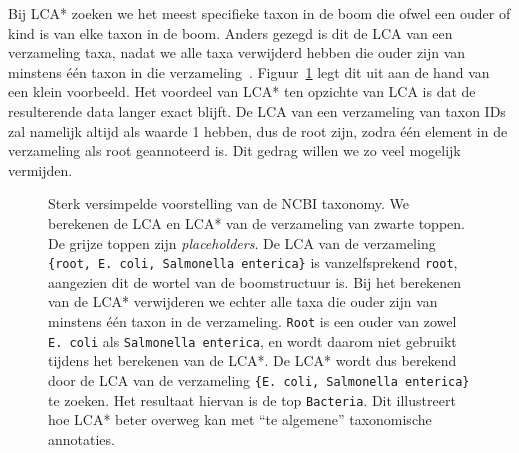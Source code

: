 Bij LCA* zoeken we het meest specifieke taxon in de boom die ofwel een ouder of kind is van elke taxon in de boom.
Anders gezegd is dit de LCA van een verzameling taxa, nadat we alle taxa verwijderd hebben die ouder zijn van minstens één taxon in die verzameling~\cite{UMGAP_paper}.
Figuur~\ref{fig:lca*_example} legt dit uit aan de hand van een klein voorbeeld.
Het voordeel van LCA* ten opzichte van LCA is dat de resulterende data langer exact blijft.
De LCA van een verzameling van taxon IDs zal namelijk altijd als waarde 1 hebben, dus de root zijn, zodra één element in de verzameling als root geannoteerd is.
Dit gedrag willen we zo veel mogelijk vermijden.
\\
\begin{figure}[ht]
    \centering

    \caption{Sterk versimpelde voorstelling van de NCBI taxonomy. We berekenen de LCA en LCA* van de verzameling van zwarte toppen. De grijze toppen zijn \textit{placeholders}. De LCA van de verzameling \texttt{\{root, E. coli, Salmonella enterica\}} is vanzelfsprekend \texttt{root}, aangezien dit de wortel van de boomstructuur is. Bij het berekenen van de LCA* verwijderen we echter alle taxa die ouder zijn van minstens één taxon in de verzameling. \texttt{Root} is een ouder van zowel \texttt{E. coli} als \texttt{Salmonella enterica}, en wordt daarom niet gebruikt tijdens het berekenen van de LCA*. De LCA* wordt dus berekend door de LCA van de verzameling \texttt{\{E. coli, Salmonella enterica\}} te zoeken. Het resultaat hiervan is de top \texttt{Bacteria}. Dit illustreert hoe LCA* beter overweg kan met ``te algemene'' taxonomische annotaties.}
    \label{fig:lca*_example}
\end{figure}

